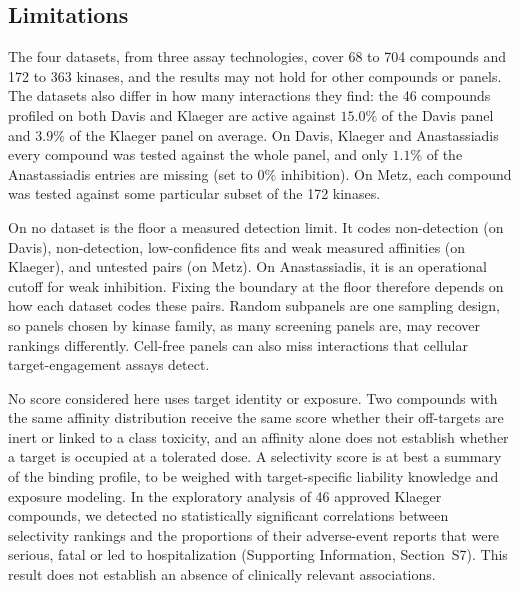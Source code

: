 \subsection{Limitations}

The four datasets, from three assay technologies, cover 68 to 704 compounds and
172 to 363 kinases, and the results may not hold for other compounds or panels.
The datasets also differ in how many interactions they find: the 46 compounds
profiled on both Davis and Klaeger are active against $15.0\%$ of the Davis
panel and $3.9\%$ of the Klaeger panel on average.
On Davis, Klaeger and Anastassiadis every compound was tested against the whole
panel, and only $1.1\%$ of the Anastassiadis entries are missing (set to $0\%$
inhibition). On Metz, each compound was tested against some particular subset of the 172
kinases. 

On no dataset is the floor a measured detection limit. It codes
non-detection (on Davis), non-detection, low-confidence fits and weak measured
affinities (on Klaeger), and untested pairs (on Metz). On Anastassiadis, it is an
operational cutoff for weak inhibition. Fixing the boundary at the floor therefore
depends on how each dataset codes these pairs. Random subpanels are one sampling design,
so panels chosen by kinase family, as many screening panels are, may recover
rankings differently. Cell-free panels can also miss interactions that
cellular target-engagement assays detect\cite{Binder2026,Binder2026correction}.

No score considered here uses target identity or exposure. Two compounds with
the same affinity distribution receive the same score whether their
off-targets are inert or linked to a class toxicity, and an affinity alone does
not establish whether a target is occupied at a tolerated dose. A selectivity
score is at best a summary of the binding profile, to be weighed with
target-specific liability knowledge and exposure modeling. In the exploratory
analysis of 46 approved Klaeger compounds, we detected no statistically
significant correlations between selectivity rankings and the proportions of
their adverse-event reports that were serious, fatal or led to hospitalization
(Supporting Information, Section~S7). This result does not establish an absence
of clinically relevant associations.
